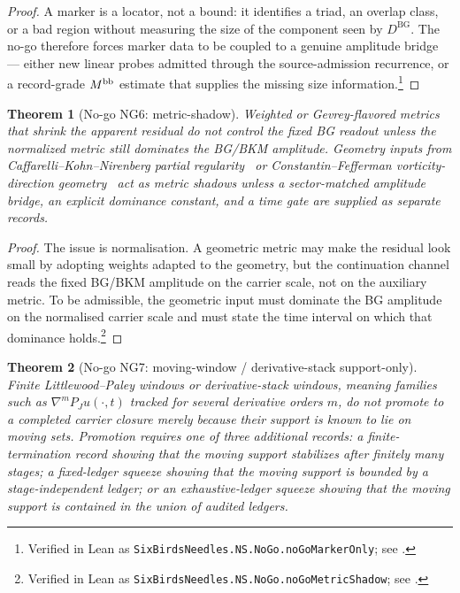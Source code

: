 \documentclass[11pt]{article}
\newcommand{\DBG}{D^{\mathrm{BG}}}
\newtheorem{theorem}{Theorem}[section]
\theoremstyle{definition}
\begin{document}
\begin{proof}
A marker is a locator, not a bound: it identifies a triad, an overlap
class, or a bad region without measuring the size of the component
seen by \(\DBG\).  The no-go therefore forces marker data to be coupled
to a genuine amplitude bridge --- either new linear probes admitted
through the source-admission recurrence, or a record-grade
\(M^{\rm bb}\) estimate that supplies the missing size information.\footnote{Verified in Lean as \texttt{SixBirdsNeedles.NS.NoGo.noGoMarkerOnly}; see .}
\end{proof}

\begin{theorem}[No-go NG6: metric-shadow]
\label{thm:ns:no-go-metric-shadow}
Weighted or Gevrey-flavored metrics that shrink the apparent residual
do not control the fixed BG readout unless the normalized metric still
dominates the BG/BKM amplitude.  Geometry inputs from
Caffarelli--Kohn--Nirenberg partial
regularity~\citep{CaffarelliKohnNirenberg1982} or
Constantin--Fefferman vorticity-direction
geometry~\citep{ConstantinFefferman1993} act as metric shadows unless
a sector-matched amplitude bridge, an explicit dominance constant,
and a time gate are supplied as separate records.
\end{theorem}

\begin{proof}
The issue is normalisation.  A geometric metric may make the residual
look small by adopting weights adapted to the geometry, but the
continuation channel reads the fixed BG/BKM amplitude on the carrier
scale, not on the auxiliary metric.  To be admissible, the geometric
input must dominate the BG amplitude on the normalised carrier scale
and must state the time interval on which that dominance holds.\footnote{Verified in Lean as \texttt{SixBirdsNeedles.NS.NoGo.noGoMetricShadow}; see .}
\end{proof}

\begin{theorem}[No-go NG7: moving-window / derivative-stack support-only]
\label{thm:ns:no-go-moving-window}
Finite Littlewood--Paley windows or derivative-stack windows, meaning
families such as \(\nabla^m P_Ju(\cdot,t)\) tracked for several
derivative orders \(m\), do not promote to a completed carrier closure
merely because their support is known to lie on moving sets.  Promotion
requires one of three additional records: a finite-termination record
showing that the moving support stabilizes after finitely many stages; a
fixed-ledger squeeze showing that the moving support is bounded by a
stage-independent ledger; or an exhaustive-ledger squeeze showing that
the moving support is contained in the union of audited ledgers.
\end{theorem}
\end{document}
